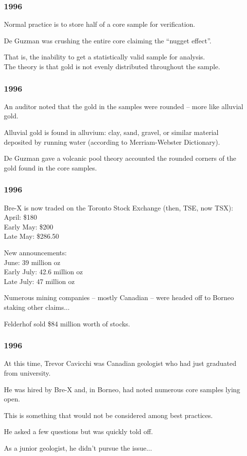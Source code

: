 \begin{frame}
\frametitle{1996}

Normal practice is to store half of a core sample for verification.

De Guzman was crushing the entire core claiming the ``nugget effect''.

That is, the inability to get a statistically valid sample for analysis.\\
\quad The theory is that gold is not evenly distributed throughout the sample.

\end{frame}



\begin{frame}
\frametitle{1996}

An auditor noted that the gold in the samples were rounded -- more like alluvial gold.

Alluvial gold is found in alluvium: clay, sand, gravel, or similar material deposited by running water (according to Merriam-Webster Dictionary).


De Guzman gave a volcanic pool theory accounted the rounded corners of the gold found in the core samples.


\end{frame}



\begin{frame}
\frametitle{1996}

Bre-X is now traded on the Toronto Stock Exchange (then, TSE, now TSX):\\
\quad April:				\$180\\
\quad Early May:		\$200\\
\quad Late May:		\$286.50

New announcements:\\
\quad June:			39 million oz\\
\quad Early July:	42.6 million oz\\
\quad Late July:	47 million oz

Numerous mining companies -- mostly Canadian -- were headed off to Borneo staking other claims...


Felderhof sold \$84 million worth of stocks.


\end{frame}



\begin{frame}
\frametitle{1996}

At this time, Trevor Cavicchi was Canadian geologist who had just graduated from university.

	He was hired by Bre-X and, in Borneo, had noted
numerous core samples lying open.

This is something that would not be considered among best practices.

He asked a few questions but was quickly told off.

As a junior geologist, he didn't pursue the issue...

\end{frame}



